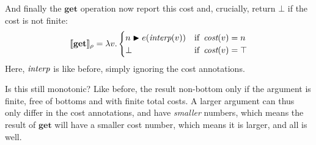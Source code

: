 \documentclass[manuscript,screen,acmsmall,nonacm]{acmart}
\newcommand{\syntax}[1]{\mathbf{#1}}
\newcommand{\sGet}{\syntax{get}}
\newcommand{\dlambda}{\mathit{\lambda}}
\newcommand{\D}[1]{\llbracket #1 \rrbracket}
\begin{document}
And finally the $\sGet$ operation now report this cost and, crucially, return $\bot$ if the cost is not finite:
\[
\D{\sGet}_\rho =\dlambda v.
\begin{cases}
n \bump e(\interp(v)) &\text{if } \cost(v) = n\\
\bot &\text{if } \cost(v) = \top
\end{cases}
\]
Here, $\operatorname{\textit{interp}}$ is like before, simply ignoring the cost annotations.

Is this still monotonic? Like before, the result non-bottom only if the argument is finite, free of bottoms and with finite total costs. A larger argument can thus only differ in the cost annotations,  and have \emph{smaller} numbers, which means the result of $\sGet$ will have a smaller cost number, which means it is larger, and all is well.



\end{document}
